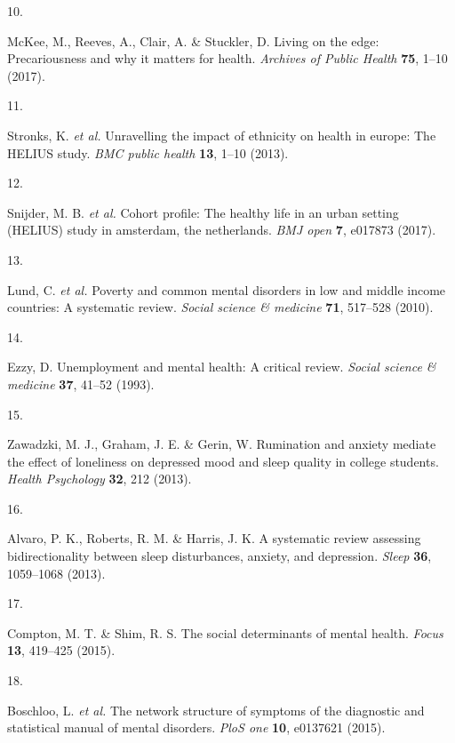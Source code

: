 \documentclass[
]{article}
\newlength{\cslhangindent}
\newlength{\csllabelwidth}
\newenvironment{CSLReferences}[2] %
 {\begin{list}{}{%
  \setlength{\itemindent}{0pt}
  \setlength{\leftmargin}{0pt}
  \setlength{\parsep}{0pt}
  \ifodd #1
   \setlength{\leftmargin}{\cslhangindent}
   \setlength{\itemindent}{-1\cslhangindent}
  \fi
  \setlength{\itemsep}{#2\baselineskip}}}
 {\end{list}}
\newcommand{\CSLLeftMargin}[1]{\parbox[t]{\csllabelwidth}{\strut#1\strut}}
\newcommand{\CSLRightInline}[1]{\parbox[t]{\linewidth - \csllabelwidth}{\strut#1\strut}}
\begin{document}
\begin{CSLReferences}{0}{0}
\CSLLeftMargin{10. }%
\CSLRightInline{McKee, M., Reeves, A., Clair, A. \& Stuckler, D. Living
on the edge: Precariousness and why it matters for health.
\emph{Archives of Public Health} \textbf{75}, 1--10 (2017).}

\CSLLeftMargin{11. }%
\CSLRightInline{Stronks, K. \emph{et al.} Unravelling the impact of
ethnicity on health in europe: The HELIUS study. \emph{BMC public
health} \textbf{13}, 1--10 (2013).}

\CSLLeftMargin{12. }%
\CSLRightInline{Snijder, M. B. \emph{et al.} Cohort profile: The healthy
life in an urban setting (HELIUS) study in amsterdam, the netherlands.
\emph{BMJ open} \textbf{7}, e017873 (2017).}

\CSLLeftMargin{13. }%
\CSLRightInline{Lund, C. \emph{et al.} Poverty and common mental
disorders in low and middle income countries: A systematic review.
\emph{Social science \& medicine} \textbf{71}, 517--528 (2010).}

\CSLLeftMargin{14. }%
\CSLRightInline{Ezzy, D. Unemployment and mental health: A critical
review. \emph{Social science \& medicine} \textbf{37}, 41--52 (1993).}

\CSLLeftMargin{15. }%
\CSLRightInline{Zawadzki, M. J., Graham, J. E. \& Gerin, W. Rumination
and anxiety mediate the effect of loneliness on depressed mood and sleep
quality in college students. \emph{Health Psychology} \textbf{32}, 212
(2013).}

\CSLLeftMargin{16. }%
\CSLRightInline{Alvaro, P. K., Roberts, R. M. \& Harris, J. K. A
systematic review assessing bidirectionality between sleep disturbances,
anxiety, and depression. \emph{Sleep} \textbf{36}, 1059--1068 (2013).}

\CSLLeftMargin{17. }%
\CSLRightInline{Compton, M. T. \& Shim, R. S. The social determinants of
mental health. \emph{Focus} \textbf{13}, 419--425 (2015).}

\CSLLeftMargin{18. }%
\CSLRightInline{Boschloo, L. \emph{et al.} The network structure of
symptoms of the diagnostic and statistical manual of mental disorders.
\emph{PloS one} \textbf{10}, e0137621 (2015).}


\end{CSLReferences}
\end{document}
